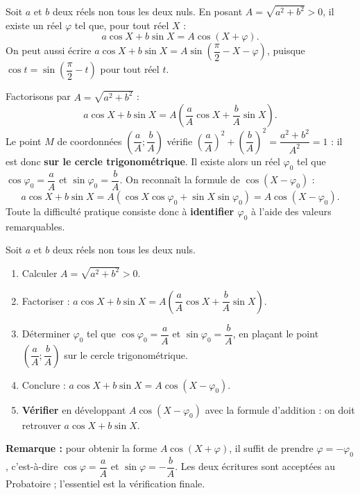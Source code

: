 \documentclass[11pt]{article}
\begin{document}
\begin{propriete}
Soit $a$ et $b$ deux réels non tous les deux nuls. En posant $A=\sqrt{a^2+b^2}>0$, il existe un réel $\varphi$ tel que, pour tout réel $X$ :
\[ a\cos X+b\sin X=A\cos(X+\varphi). \]
On peut aussi écrire $a\cos X+b\sin X=A\sin\left(\dfrac{\pi}{2}-X-\varphi\right)$, puisque $\cos t=\sin\left(\dfrac{\pi}{2}-t\right)$ pour tout réel $t$.
\end{propriete}

\begin{experience}
Factorisons par $A=\sqrt{a^2+b^2}$ :
\[ a\cos X+b\sin X=A\left(\dfrac{a}{A}\cos X+\dfrac{b}{A}\sin X\right). \]
Le point $M$ de coordonnées $\left(\dfrac{a}{A};\dfrac{b}{A}\right)$ vérifie $\left(\dfrac{a}{A}\right)^2+\left(\dfrac{b}{A}\right)^2=\dfrac{a^2+b^2}{A^2}=1$ : il est donc \textbf{sur le cercle trigonométrique}. Il existe alors un réel $\varphi_0$ tel que $\cos\varphi_0=\dfrac{a}{A}$ et $\sin\varphi_0=\dfrac{b}{A}$. On reconnaît la formule de $\cos(X-\varphi_0)$ :
\[ a\cos X+b\sin X=A\left(\cos X\cos\varphi_0+\sin X\sin\varphi_0\right)=A\cos(X-\varphi_0). \]
Toute la difficulté pratique consiste donc à \textbf{identifier $\varphi_0$} à l'aide des valeurs remarquables.
\end{experience}

\begin{methode}
Soit $a$ et $b$ deux réels non tous les deux nuls.
\begin{enumerate}
\item Calculer $A=\sqrt{a^2+b^2}>0$.
\item Factoriser : $a\cos X+b\sin X=A\left(\dfrac{a}{A}\cos X+\dfrac{b}{A}\sin X\right)$.
\item Déterminer $\varphi_0$ tel que $\cos\varphi_0=\dfrac{a}{A}$ et $\sin\varphi_0=\dfrac{b}{A}$, en plaçant le point $\left(\dfrac{a}{A};\dfrac{b}{A}\right)$ sur le cercle trigonométrique.
\item Conclure : $a\cos X+b\sin X=A\cos(X-\varphi_0)$.
\item \textbf{Vérifier} en développant $A\cos(X-\varphi_0)$ avec la formule d'addition : on doit retrouver $a\cos X+b\sin X$.
\end{enumerate}
\textbf{Remarque :} pour obtenir la forme $A\cos(X+\varphi)$, il suffit de prendre $\varphi=-\varphi_0$, c'est-à-dire $\cos\varphi=\dfrac{a}{A}$ et $\sin\varphi=-\dfrac{b}{A}$. Les deux écritures sont acceptées au Probatoire ; l'essentiel est la vérification finale.
\end{methode}
\end{document}
